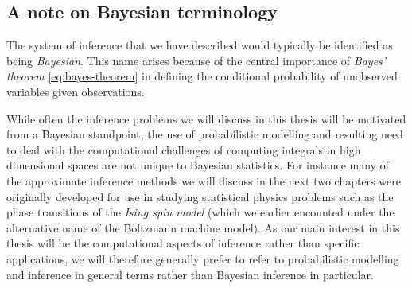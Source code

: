 \subsection{A note on Bayesian terminology}






The system of inference that we have described would typically be identified as being \emph{Bayesian}. This name arises because of the central importance of \emph{Bayes' theorem} \eqref{eq:bayes-theorem} in defining the conditional probability of unobserved variables given observations.

While often the inference problems we will discuss in this thesis will be motivated from a Bayesian standpoint, the use of probabilistic modelling and resulting need to deal with the computational challenges of computing integrals in high dimensional spaces are not unique to Bayesian statistics. For instance many of the approximate inference methods we will discuss in the next two chapters were originally developed for use in studying statistical physics problems such as the phase transitions of the \emph{Ising spin model} (which we earlier encounted under the alternative name of the Boltzmann machine model). As our main interest in this thesis will be the computational aspects of inference rather than specific applications, we will therefore generally prefer to refer to probabilistic modelling and inference in general terms rather than Bayesian inference in particular.


